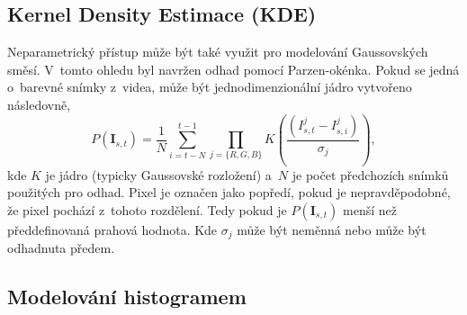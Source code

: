 \newpage












\subsection{Kernel Density Estimace (KDE)}
\label{sec:BS_teorie_KDE}

\par{Neparametrický přístup může být také využit pro modelování Gaussovských směsí. V~tom\-to ohledu byl navržen odhad pomocí Parzen-okénka. Pokud se jedná o~barevné snímky z~videa, může být jednodimenzionální jádro vytvořeno následovně,
\begin{equation}
	P \left( \bm{I}_{s, t} \right) = \frac{1}{N} \sum_{i = t - N}^{t - 1} \prod_{j=\{R,G,B\}} K \left( \frac{ \left( I_{s, t}^{j} - I_{s, i}^{j} \right) }{\sigma_j} \right),
\end{equation}
kde $K$ je jádro (typicky Gaussovské rozložení) a~$N$ je počet předchozích snímků použitých pro odhad. Pixel je označen jako popředí, pokud je nepravděpodobné, že pixel pochází z~tohoto rozdělení. Tedy pokud je $P \left( \bm{I}_{s, t} \right)$ menší než předdefinovaná prahová hodnota. Kde $\sigma_j$ může být neměnná nebo může být odhadnuta předem.}













\newpage







\subsection{Modelování histogramem}
\label{sec:BS_teorie_modelovani_histogramem}

